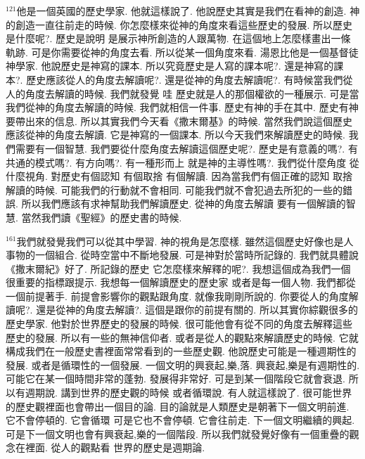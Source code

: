 \documentclass{book}
\begin{document}
$^{121}$他是一個英國的歷史學家.
他就這樣說了.
他說歷史其實是我們在看神的創造.
神的創造一直往前走的時候.
你怎麼樣來從神的角度來看這些歷史的發展.
所以歷史是什麼呢?.
歷史是說明 是展示神所創造的人跟萬物.
在這個地上怎麼樣畫出一條軌跡.
可是你需要從神的角度去看.
所以從某一個角度來看.
湯恩比他是一個基督徒神學家.
他說歷史是神寫的課本.
所以究竟歷史是人寫的課本呢?.
還是神寫的課本?.
歷史應該從人的角度去解讀呢?.
還是從神的角度去解讀呢?.
有時候當我們從人的角度去解讀的時候.
我們就發覺 哇 歷史就是人的那個權欲的一種展示.
可是當我們從神的角度去解讀的時候.
我們就相信一件事.
歷史有神的手在其中.
歷史有神要帶出來的信息.
所以其實我們今天看《撒末爾基》的時候.
當然我們說這個歷史應該從神的角度去解讀.
它是神寫的一個課本.
所以今天我們來解讀歷史的時候.
我們需要有一個智慧.
我們要從什麼角度去解讀這個歷史呢?.
歷史是有意義的嗎?.
有共通的模式嗎?.
有方向嗎?.
有一種形而上 就是神的主導性嗎?.
我們從什麼角度 從什麼視角.
對歷史有個認知 有個取捨 有個解讀.
因為當我們有個正確的認知 取捨 解讀的時候.
可能我們的行動就不會相同.
可能我們就不會犯過去所犯的一些的錯誤.
所以我們應該有求神幫助我們解讀歷史.
從神的角度去解讀 要有一個解讀的智慧.
當然我們讀《聖經》的歷史書的時候.

$^{161}$我們就發覺我們可以從其中學習.
神的視角是怎麼樣.
雖然這個歷史好像也是人事物的一個組合.
從時空當中不斷地發展.
可是神對於當時所記錄的.
我們就具體說《撒末爾紀》好了.
所記錄的歷史 它怎麼樣來解釋的呢?.
我想這個成為我們一個很重要的指標跟提示.
我想每一個解讀歷史的歷史家 或者是每一個人物.
我們都從一個前提著手.
前提會影響你的觀點跟角度.
就像我剛剛所說的.
你要從人的角度解讀呢?.
還是從神的角度去解讀?.
這個是跟你的前提有關的.
所以其實你綜觀很多的歷史學家.
他對於世界歷史的發展的時候.
很可能他會有從不同的角度去解釋這些歷史的發展.
所以有一些的無神信仰者.
或者是從人的觀點來解讀歷史的時候.
它就構成我們在一般歷史書裡面常常看到的一些歷史觀.
他說歷史可能是一種週期性的發展.
或者是循環性的一個發展.
一個文明的興衰起,樂,落.
興衰起,樂是有週期性的.
可能它在某一個時間非常的蓬勃.
發展得非常好.
可是到某一個階段它就會衰退.
所以有週期說.
講到世界的歷史觀的時候 或者循環說.
有人就這樣說了.
很可能世界的歷史觀裡面也會帶出一個目的論.
目的論就是人類歷史是朝著下一個文明前進.
它不會停頓的.
它會循環 可是它也不會停頓.
它會往前走.
下一個文明繼續的興起.
可是下一個文明也會有興衰起,樂的一個階段.
所以我們就發覺好像有一個重疊的觀念在裡面.
從人的觀點看 世界的歷史是週期論.
\end{document}
